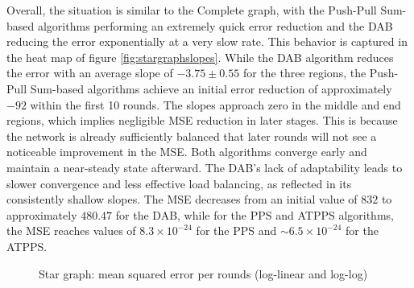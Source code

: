 Overall, the situation is similar to the Complete graph, with the Push-Pull Sum-based algorithms performing an extremely quick error reduction and the DAB reducing the error exponentially at a very slow rate. This behavior is captured in the heat map of figure \ref{fig:stargraphslopes}. While the DAB algorithm reduces the error with an average slope of $-3.75 \pm 0.55$ for the three regions, the Push-Pull Sum-based algorithms achieve an initial error reduction of approximately $-92$ within the first 10 rounds. The slopes approach zero in the middle and end regions, which implies negligible MSE reduction in later stages. This is because the network is already sufficiently balanced that later rounds will not see a noticeable improvement in the MSE. Both algorithms converge early and maintain a near-steady state afterward. The DAB's lack of adaptability leads to slower convergence and less effective load balancing, as reflected in its consistently shallow slopes. The MSE decreases from an initial value of $832$ to approximately $480.47$ for the DAB, while for the PPS and ATPPS algorithms, the MSE reaches values of $8.3\times 10^{-24}$ for the PPS and $\sim6.5 \times 10^{-24}$ for the ATPPS.
\begin{figure}[!ht]
    \centering
    \hfil
    \caption{Star graph: mean squared error per rounds (log-linear
    and log-log)}
        \label{fig:stargraphMSEperRoundLogLog}
\end{figure}

